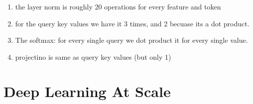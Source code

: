 \documentclass[11pt]{article}
\begin{document}
\begin{figure}[H]
    \centering
\end{figure}    

\begin{enumerate}
    \item the layer norm is roughly 20 operations for every feature and token
    \item for the query key values we have it 3 times, and 2 becuase its a dot product.
    \item The softmax: for every single query we dot product it for every single value.
    \item projectino is same as query key values (but only 1)
\end{enumerate}

\section{Deep Learning At Scale}
\end{document}
